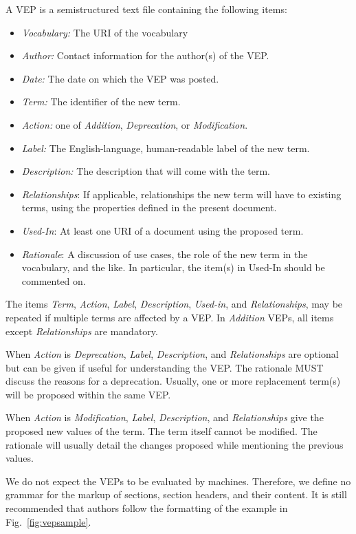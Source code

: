 \documentclass[11pt,a4paper]{ivoa}
\newcommand{\vepitem}[1]{\emph{#1}}
\begin{document}
A VEP is a semistructured text file containing the following items:

\begin{itemize}
\item \vepitem{Vocabulary:} The URI of the vocabulary
\item \vepitem{Author:}  Contact information for the author(s) of
the VEP.
\item \vepitem{Date:} The date on which the VEP was posted.
\item \vepitem{Term:} The identifier of the new term.
\item \vepitem{Action:} one of \textit{Addition}, \textit{Deprecation}, or
\textit{Modification}.
\item \vepitem{Label:} The English-language, human-readable label of the new term.
\item \vepitem{Description:} The description that will come with the term.
\item \vepitem{Relationships}: If applicable, relationships the new
term will have to existing terms, using the properties defined in
the present document.
\item \vepitem{Used-In}: At least one URI of a document using the
proposed term.
\item \vepitem{Rationale}: A discussion of use cases, the role of the new term in
the vocabulary, and the like.  In particular, the item(s) in Used-In
should be commented on.
\end{itemize}

The items \vepitem{Term}, \vepitem{Action}, \vepitem{Label},
\vepitem{Description}, \vepitem{Used-in}, 
and \vepitem{Relationships},  may be repeated if
multiple terms are affected by a VEP.  In \textit{Addition} VEPs, all items
except \vepitem{Relationships} are mandatory.

When \vepitem{Action} is \textit{Deprecation}, \vepitem{Label},
\vepitem{Description}, and \vepitem{Relationships} are optional but can be
given if useful for understanding the VEP.  The rationale MUST discuss
the reasons for a deprecation.  Usually, one or more replacement
term(s) will be proposed within the same VEP.

When \vepitem{Action} is \textit{Modification}, \vepitem{Label},
\vepitem{Description}, and \vepitem{Relationships} give the proposed new
values of the term.  The term itself cannot be modified.  The rationale
will usually detail the changes proposed while mentioning the previous 
values.

We do not expect the VEPs to be evaluated by machines.  Therefore, we
define no grammar for the markup of sections, section headers, and their
content.  It is still recommended that authors follow the formatting of
the example in Fig.~\ref{fig:vepsample}.
\end{document}
